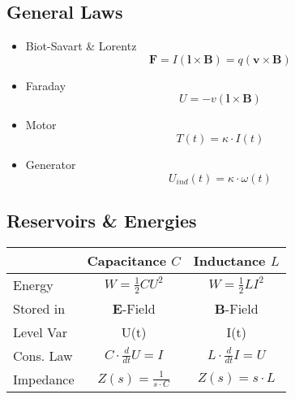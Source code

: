 \subsection{General Laws}
    \begin{itemize}[label=-]
        \item Biot-Savart \& Lorentz
            $$ \boldsymbol{F} = I (\boldsymbol{l} \times \boldsymbol{B}) = q (\boldsymbol{v} \times \boldsymbol{B}) $$
        \item Faraday
            $$ U = - v (\boldsymbol{l} \times \boldsymbol{B})$$
        \item Motor
            $$ T(t) = \kappa \cdot I(t)$$
        \item Generator
            $$ U_{ind}(t) = \kappa \cdot \omega(t)$$
    \end{itemize}

\subsection{Reservoirs \& Energies}
\begin{center}
    \renewcommand{\arraystretch}{1.5}
    \begin{tabular}{l|c|c}
        & Capacitance $C$& Inductance $L$\\
        \hline \hline
        Energy & $W = \frac{1}{2} C U^2$ & $W = \frac{1}{2} L I^2$\\\hline
        Stored in & $\boldsymbol{E}$-Field & $\boldsymbol{B}$-Field\\\hline
        Level Var & U(t) & I(t)\\\hline
        Cons. Law & $C \cdot \frac{d}{dt}U = I$ & $L \cdot \frac{d}{dt}I = U$\\\hline
        Impedance & $Z(s) = \frac{1}{s \cdot C}$ & $Z(s) = s \cdot L$
    \end{tabular}
\end{center}